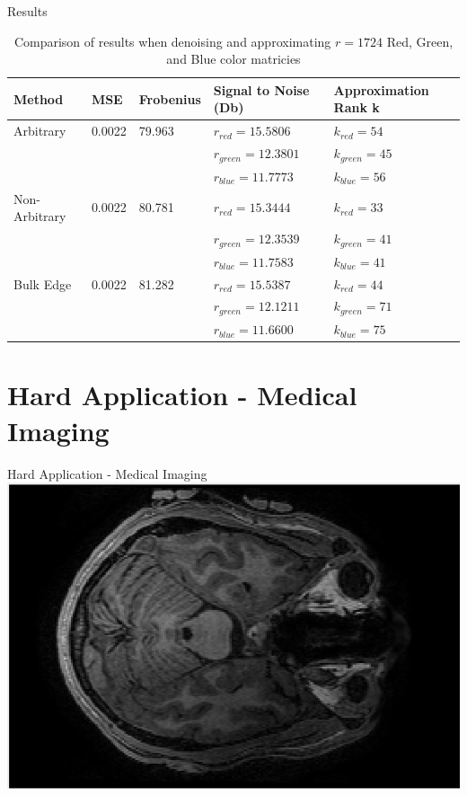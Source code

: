 \documentclass[aspectratio=169,xcolor=dvipsnames]{beamer}
\begin{document}
	\begin{frame}{Results}
		\begin{table}
			\begin{tabular}{l | l | l | l |l}
				\toprule
				\textbf{Method} & \textbf{MSE} & \textbf{Frobenius} & \textbf{Signal to Noise (Db)} & \textbf{Approximation Rank k} \\
				\midrule
				Arbitrary          & 0.0022           & 79.963 &  $r_{red} = 15.5806$ &  $k_{red} = 54$ \\
				& & & $r_{green} = 12.3801$ & $k_{green} = 45$ \\
				& & & $r_{blue} = 11.7773$ & $k_{blue} = 56$\\\hline
				Non-Arbitrary         & 0.0022            & 80.781 & $r_{red} = 15.3444$ & $k_{red} = 33$             \\
				& & & $r_{green} = 12.3539$ & $k_{green} = 41$\\
				& & & $r_{blue} = 11.7583$ & $k_{blue} = 41$\\\hline
				Bulk Edge       & 0.0022            & 81.282 & $r_{red} = 15.5387$ &      $k_{red} = 44$         \\
				& & & $r_{green} = 12.1211$ & $k_{green} = 71$\\
				& & & $r_{blue} = 11.6600$  & $k_{blue} = 75$\\
				\bottomrule
			\end{tabular}
			\caption{Comparison of results when denoising and approximating $r = 1724$ Red, Green, and Blue color matricies}
		\end{table}
	\end{frame}

	
	\section{Hard Application - Medical Imaging}
	
	\begin{frame}{Hard Application - Medical Imaging}
		\centering
		\includegraphics[scale=0.5]{BrainScan.png}
	\end{frame}
		
\end{document}
